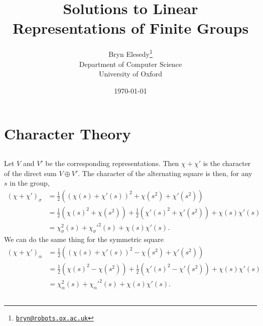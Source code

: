 \documentclass[a4paper, oneside, 10pt]{article}
\title{Solutions to Linear Representations of Finite Groups}
\author{%
    Bryn Elesedy\thanks{\href{mailto:bryn@robots.ox.ac.uk}{\texttt{bryn@robots.ox.ac.uk}}}\\
Department of Computer Science\\
University of Oxford}
\date{\today}
\numberwithin{Answer}{section}
\numberwithin{Exercise}{section}
\begin{document}
\maketitle
\tableofcontents
\clearpage
\setcounter{section}{1}

\section{Character Theory}
\subsection{}
Let $V$ and $V'$ be the corresponding representations.
Then $\chi + \chi'$ is the character of the direct sum $V \oplus V'$.
The character of the alternating square is then, for any $s$ in the group,
\begin{align*}
    (\chi + \chi')_{\sigma} 
    &= \frac12 ((\chi(s) + \chi'(s))^2 + \chi(s^2) +\chi'(s^2)) \\
    &= \frac12(\chi(s)^2 + \chi(s^2)) + \frac12(\chi'(s)^2 + \chi'(s^2)) + \chi(s) \chi'(s)\\
    &= \chi_{\sigma}^2(s) + {\chi_{\sigma}'}^2(s) + \chi(s)\chi'(s).
\end{align*}
We can do the same thing for the symmetric square
\begin{align*}
    (\chi + \chi')_{\alpha} 
    &= \frac12 ((\chi(s) + \chi'(s))^2 - \chi(s^2) +\chi'(s^2)) \\
    &= \frac12(\chi(s)^2 - \chi(s^2)) + \frac12(\chi'(s)^2 - \chi'(s^2)) + \chi(s) \chi'(s)\\
    &= \chi_{\alpha}^2(s) + {\chi_{\alpha}'}^2(s) + \chi(s)\chi'(s).
\end{align*}

\subsection{}








\nocite{*}


\end{document}
